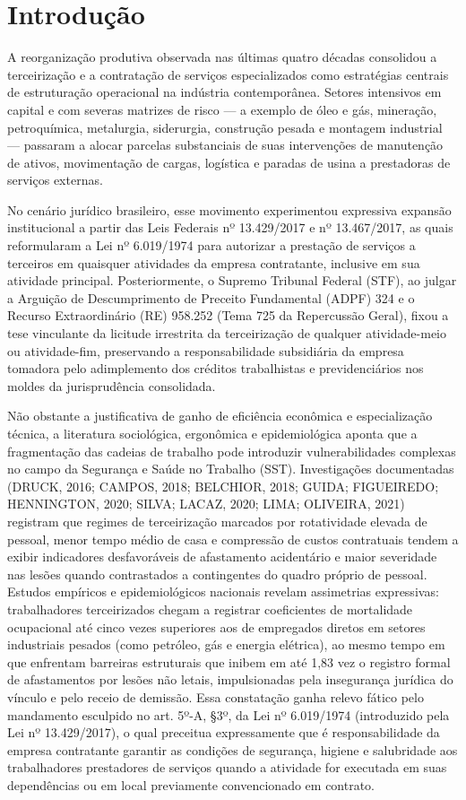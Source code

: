 \documentclass[12pt,a4paper]{article}
\begin{document}
\section{Introdução}

A reorganização produtiva observada nas últimas quatro décadas consolidou a terceirização e a contratação de serviços especializados como estratégias centrais de estruturação operacional na indústria contemporânea. Setores intensivos em capital e com severas matrizes de risco — a exemplo de óleo e gás, mineração, petroquímica, metalurgia, siderurgia, construção pesada e montagem industrial — passaram a alocar parcelas substanciais de suas intervenções de manutenção de ativos, movimentação de cargas, logística e paradas de usina a prestadoras de serviços externas.

No cenário jurídico brasileiro, esse movimento experimentou expressiva expansão institucional a partir das Leis Federais nº 13.429/2017 e nº 13.467/2017, as quais reformularam a Lei nº 6.019/1974 para autorizar a prestação de serviços a terceiros em quaisquer atividades da empresa contratante, inclusive em sua atividade principal. Posteriormente, o Supremo Tribunal Federal (STF), ao julgar a Arguição de Descumprimento de Preceito Fundamental (ADPF) 324 e o Recurso Extraordinário (RE) 958.252 (Tema 725 da Repercussão Geral), fixou a tese vinculante da licitude irrestrita da terceirização de qualquer atividade-meio ou atividade-fim, preservando a responsabilidade subsidiária da empresa tomadora pelo adimplemento dos créditos trabalhistas e previdenciários nos moldes da jurisprudência consolidada.

Não obstante a justificativa de ganho de eficiência econômica e especialização técnica, a literatura sociológica, ergonômica e epidemiológica aponta que a fragmentação das cadeias de trabalho pode introduzir vulnerabilidades complexas no campo da Segurança e Saúde no Trabalho (SST). Investigações documentadas (DRUCK, 2016; CAMPOS, 2018; BELCHIOR, 2018; GUIDA; FIGUEIREDO; HENNINGTON, 2020; SILVA; LACAZ, 2020; LIMA; OLIVEIRA, 2021) registram que regimes de terceirização marcados por rotatividade elevada de pessoal, menor tempo médio de casa e compressão de custos contratuais tendem a exibir indicadores desfavoráveis de afastamento acidentário e maior severidade nas lesões quando contrastados a contingentes do quadro próprio de pessoal. Estudos empíricos e epidemiológicos nacionais revelam assimetrias expressivas: trabalhadores terceirizados chegam a registrar coeficientes de mortalidade ocupacional até cinco vezes superiores aos de empregados diretos em setores industriais pesados (como petróleo, gás e energia elétrica), ao mesmo tempo em que enfrentam barreiras estruturais que inibem em até 1,83 vez o registro formal de afastamentos por lesões não letais, impulsionadas pela insegurança jurídica do vínculo e pelo receio de demissão. Essa constatação ganha relevo fático pelo mandamento esculpido no art. 5º-A, §3º, da Lei nº 6.019/1974 (introduzido pela Lei nº 13.429/2017), o qual preceitua expressamente que é responsabilidade da empresa contratante garantir as condições de segurança, higiene e salubridade aos trabalhadores prestadores de serviços quando a atividade for executada em suas dependências ou em local previamente convencionado em contrato.
\end{document}
